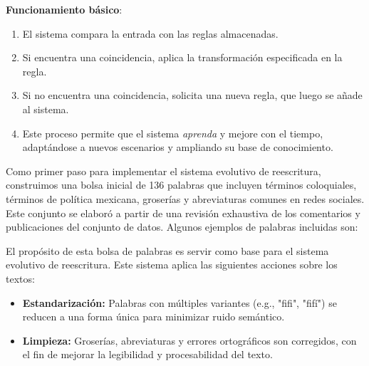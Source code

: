 \documentclass[10pt, a4paper]{article}
\begin{document}
	\textbf{Funcionamiento básico}:
	\begin{enumerate}
		\item El sistema compara la entrada con las reglas almacenadas.
		\item Si encuentra una coincidencia, aplica la transformación especificada en la regla.
		\item Si no encuentra una coincidencia, solicita una nueva regla, que luego se añade al sistema.
		\item Este proceso permite que el sistema \textit{aprenda} y mejore con el tiempo, adaptándose a nuevos escenarios y ampliando su base de conocimiento.
	\end{enumerate}
	
	
	Como primer paso para implementar el sistema evolutivo de reescritura, construimos una bolsa inicial de 136 palabras que incluyen términos coloquiales, términos de política mexicana, groserías y abreviaturas comunes en redes sociales. Este conjunto se elaboró a partir de una revisión exhaustiva de los comentarios y publicaciones del conjunto de datos. Algunos ejemplos de palabras incluidas son:
	
	\begin{table}[H]
		\centering
		\caption{Ejemplo de palabras incluidas en la bolsa inicial.}
		\label{tab:bolsa_palabras}
	\end{table}
	
	
	El propósito de esta bolsa de palabras es servir como base para el sistema evolutivo de reescritura. Este sistema aplica las siguientes acciones sobre los textos:
	\begin{itemize}
		\item \textbf{Estandarización:} Palabras con múltiples variantes (e.g., "fifi", "fifí") se reducen a una forma única para minimizar ruido semántico.
		\item \textbf{Limpieza:} Groserías, abreviaturas y errores ortográficos son corregidos, con el fin de mejorar la legibilidad y procesabilidad del texto.
	\end{itemize}
	
\end{document}
